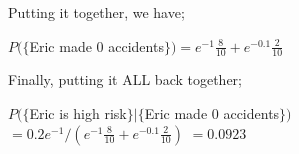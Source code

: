 \documentclass[12pt]{article}
\begin{document}
Putting it together, we have;
\begin{center}
$P(\{$Eric made 0 accidents$\})=e^{-1}\frac{8}{10}+e^{-0.1}\frac{2}{10}$\\
\end{center}

Finally, putting it ALL back together;\\
\begin{center}
$P( \{$Eric is high risk$\} | \{$Eric made 0 accidents$\})$\\
$=0.2e^{-1}/( e^{-1}\frac{8}{10}+e^{-0.1}\frac{2}{10} )$
$=0.0923$
\end{center}
\end{document}
